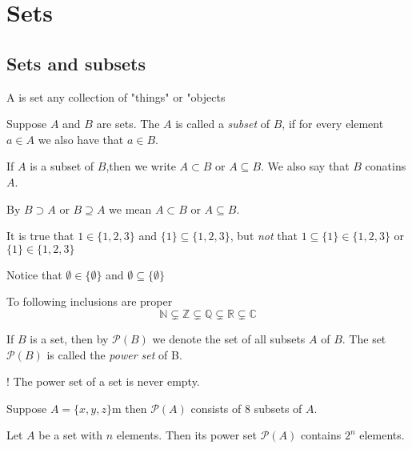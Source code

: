 \section{Sets}
\subsection{Sets and subsets}
\begin{definition}[Set]
    A is set any collection of "things" or "objects
\end{definition}
\begin{definition}[subset]
    Suppose $A$ and $B$ are sets. The $A$ is called a \emph{subset} of $B$,
    if for every element $ a \in A $ we also have that $ a \in B $. \par
    If $A$ is a subset of $B$,then we write $ A \subset B $ or $ A \subseteq B $. We also say that $B$ conatins $A$. \par
    By $ B \supset A $ or $ B \supseteq A $ we mean $ A \subset B $ or $ A \subseteq B $.
\end{definition}
\begin{example}
    It is true that $ 1 \in \{1,2,3\} $ and $ \{1\} \subseteq \{1,2,3\} $, but \emph{not} that $ 1\subseteq \{1\} \in \{1,2,3\} $ or $ \{1\} \in \{1,2,3\} $
\end{example}
\begin{example}
    Notice that $ \emptyset \in \{\emptyset\} $ and $ \emptyset \subseteq \{\emptyset\} $
\end{example}
\begin{example}
    To following inclusions are proper $$ \mathbb{N} \subsetneq \mathbb{Z} \subsetneq \mathbb{Q} \subsetneq \mathbb{R} \subsetneq \mathbb{C} $$
\end{example}

\begin{definition}
    If $B$ is a set, then by $ \mathcal{P}(B) $ we denote the set of all subsets $A$ of $B$. The set $ \mathcal{P}(B) $ is called the \emph{power set} of B.
    \par
    {\color{red} !} The power set of a set is never empty.
\end{definition}

\begin{example}
    Suppose $ A = \{x,y,z\} $m then $ \mathcal{P}(A) $ consists of 8 subsets of $A$.
\end{example}

\begin{proposition}
    Let $ A $ be a set with $n$ elements. Then its power set $ \mathcal{P}(A) $ contains $ 2^n $ elements.
\end{proposition}

